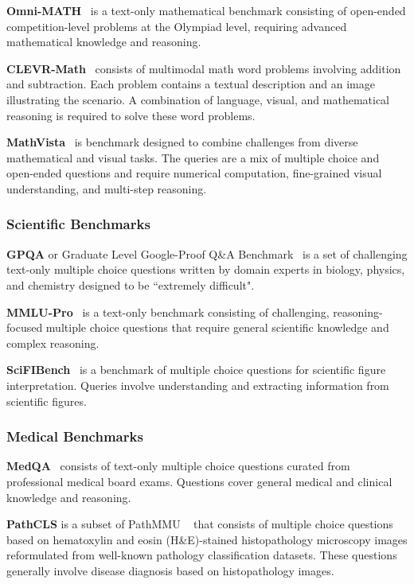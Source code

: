 \textbf{Omni-MATH}~\cite{gao2024omni} is a text-only mathematical benchmark consisting of open-ended competition-level problems at the Olympiad level, requiring advanced mathematical knowledge and reasoning.

\textbf{CLEVR-Math}~\cite{lindstrom2022clevr} consists of multimodal math word problems involving addition and subtraction. Each problem contains a textual description and an image illustrating the scenario. A combination of language, visual, and mathematical reasoning is required to solve these word problems.

\textbf{MathVista}~\cite{lu2024mathvista} is benchmark designed to combine challenges from diverse mathematical and visual tasks. The queries are a mix of multiple choice and open-ended questions and require numerical computation, fine-grained visual understanding, and multi-step reasoning.

\subsubsection{Scientific Benchmarks}

\textbf{GPQA} or Graduate Level Google-Proof Q\&A Benchmark~\cite{rein2023gpqa} is a set of challenging text-only multiple choice questions written by domain experts in biology, physics, and chemistry designed to be ``extremely difficult". 

\textbf{MMLU-Pro}~\cite{wang2024mmlu} is a text-only benchmark consisting of challenging, reasoning-focused multiple choice questions that require general scientific knowledge and complex reasoning.

\textbf{SciFIBench}~\cite{roberts2024scifibench} is a benchmark of multiple choice questions for scientific figure interpretation. Queries involve understanding and extracting information from scientific figures. 

\subsubsection{Medical Benchmarks}

\textbf{MedQA}~\cite{jin2021disease} consists of text-only multiple choice questions curated from professional medical board exams. Questions cover general medical and clinical knowledge and reasoning.

\textbf{PathCLS} is a subset of PathMMU ~\cite{sun2025pathmmu} that consists of multiple choice questions based on hematoxylin and eosin (H\&E)-stained histopathology microscopy images reformulated from well-known pathology classification datasets. These questions generally involve disease diagnosis based on histopathology images. 


